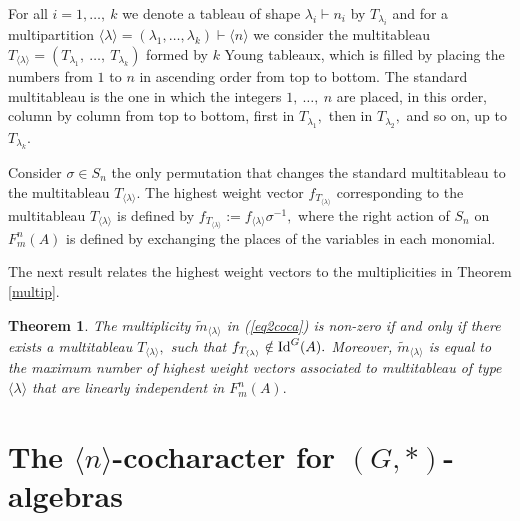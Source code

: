 \documentclass{amsart}
\newcommand{\Idg}{\ensuremath{\textnormal{Id}^{G}}}
\newcommand{\IdG}{\ensuremath{\textnormal{Id}^{(G,\ast)}}}
\newtheorem{teorema}{Theorem}[section]
\numberwithin{equation}{section}
\begin{document}
 

For all $i = 1, \ldots ,~ k$ we denote a tableau of shape $\lambda_i \vdash n_i$ by $T_{\lambda_i}$ and for a multipartition $\langle \lambda \rangle =
(\lambda_1, \ldots, \lambda_{k}) \vdash \langle n \rangle$ we consider the multitableau $T_{\langle \lambda \rangle} = (T_{\lambda_1} , ~\ldots ,~ T_{\lambda_{k}} )$ formed by $k$ Young tableaux, which
is filled by placing the numbers from $1$ to $n$ in ascending order from top to bottom. The standard multitableau is the one in which the integers $1, ~\ldots ,~ n$ are placed, in this order, column by column   from top to bottom, first in $T_{\lambda_{1}},$ then in $T_{\lambda_{2}},$ and so on, up to $T_{\lambda_{k}} .$ 







Consider $\sigma \in S_n$ the only permutation that changes the standard
multitableau to the multitableau $T_{\langle \lambda \rangle}.$ The highest weight vector $f_{T_{\langle \lambda \rangle}}$ corresponding to the multitableau
$T_{\langle \lambda \rangle}$ is defined by
$f_{T_{\langle \lambda \rangle}}:= f_{{\langle \lambda \rangle}}\sigma^{-1},$  
where the right action of $S_n$ on $F^n_m(A)$ is defined by exchanging the places of the variables in each monomial.   

The next result relates the highest weight vectors to the multiplicities in Theorem \ref{multip}. 

\begin{teorema}\label{multiplicity}
	The multiplicity $\tilde{m}_{\langle \lambda \rangle}$ in (\ref{eq2coca}) is non-zero if and only if there exists a multitableau $T_{\langle \lambda \rangle},$ such that $f_{T_{\langle \lambda \rangle}} \notin \Idg(A).$ 
	Moreover, $\tilde{m}_{\langle \lambda \rangle}$ is equal to the maximum number of highest weight vectors  associated to multitableau of type $\langle \lambda \rangle$ that are linearly independent in $F_{m}^n(A).$ %






\end{teorema}





 \section{The $\langle n \rangle$-cocharacter for $(G,*)$-algebras} 
\end{document}
